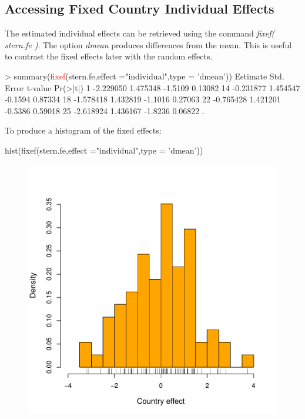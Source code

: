 \documentclass[landscape,letterpaper,9pt]{article}
\begin{document}
\newpage
\subsection{Accessing Fixed Country Individual Effects}
The estimated individual effects can be retrieved using the command \emph{fixef( stern.fe )}. The option 
\emph{dmean} produces differences from the mean. This is useful to contrast the fixed effects later with the
random effects.
\begin{CVerbatim}

> summary(\textcolor{red}{fixef}(stern.fe,effect ="individual",type = 'dmean'))
     Estimate Std. Error t-value Pr(>|t|)
1   -2.229050   1.475348 -1.5109  0.13082
14  -0.231877   1.454547 -0.1594  0.87334
18  -1.578418   1.432819 -1.1016  0.27063
22  -0.765428   1.421201 -0.5386  0.59018
25  -2.618924   1.436167 -1.8236  0.06822 .
\end{CVerbatim}

To produce a histogram of the fixed effects:
\begin{CVerbatim}
hist(fixef(stern.fe,effect ="individual",type = 'dmean'))
\end{CVerbatim}
\begin{center}
\begin{figure}[h!]
  \centering \leavevmode \includegraphics[angle=0,width=5.5in]{fixedcountryeff.pdf}
\end{figure}
\end{center}
\end{document}
